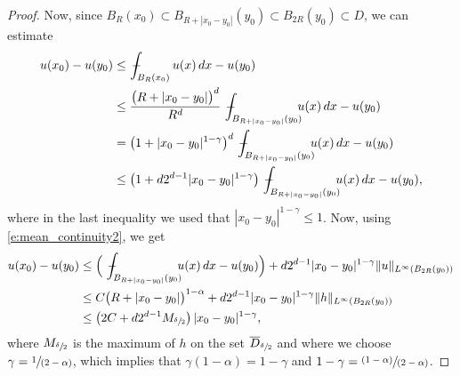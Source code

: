\documentclass[11pt]{article}
\numberwithin{equation}{section}
\newcommand{\pspfrac}[2]{\sfrac{(#1)}{(#2)}}
\newcommand{\spfrac}[2]{\sfrac{#1}{(#2)}}
\theoremstyle{plain}
\theoremstyle{definition}
\let\ds\displaystyle
\newcommand{\mean}[1]{\,-\hskip-1.08em\int_{#1}}
\begin{document}
\begin{proof}
Now, since $B_{R}(x_0)\subset B_{R+|x_0-y_0|}(y_0)\subset B_{2R}(y_0)\subset D$, we can estimate
\begin{align*}
u(x_0)-u(y_0)&\le \mean{B_R(x_0)}{u(x)\,dx}-u(y_0)\\
&\le \frac{\big(R+|x_0-y_0|\big)^d}{R^d}\mean{B_{R+|x_0-y_0|}(y_0)}{\hspace*{-2mm}u(x)\,dx}-u(y_0)\\
&= \left(1+|x_0-y_0|^{1-\gamma}\right)^d\mean{B_{R+|x_0-y_0|}(y_0)}{\hspace*{-2mm}u(x)\,dx}-u(y_0)\\
&\le \left(1+d2^{d-1}|x_0-y_0|^{1-\gamma}\right)\mean{B_{R+|x_0-y_0|}(y_0)}{\hspace*{-2mm}u(x)\,dx}-u(y_0),
\end{align*}
where in the last inequality we used that $|x_0-y_0|^{1-\gamma}\le 1$. Now, using \eqref{e:mean_continuity2}, we get
\begin{align*}
u(x_0)-u(y_0)
&\le \Big(\mean{B_{R+|x_0-y_0|}(y_0)}{\hspace*{-2mm}u(x)\,dx}-u(y_0)\Big)+d2^{d-1}|x_0-y_0|^{1-\gamma}\|u\|_{L^\infty(B_{2R}(y_0))}\\
&\le C\big(R+|x_0-y_0|\big)^{1-\alpha}+d2^{d-1}|x_0-y_0|^{1-\gamma}\|h\|_{L^\infty(B_{2R}(y_0))}\\
&\le \left(2C+d2^{d-1}M_{\sfrac\delta2}\right)|x_0-y_0|^{1-\gamma},
\end{align*}
where $M_{\sfrac\delta2}$ is the maximum of $h$ on the set $\overline D_{\sfrac\delta2}$ and where we choose $\ds\gamma=\spfrac1{2-\alpha}$, which implies that
$\gamma(1-\alpha)=1-\gamma$ and $\ds1-\gamma=\pspfrac{1-\alpha}{2-\alpha}$.
\end{proof}
\end{document}
